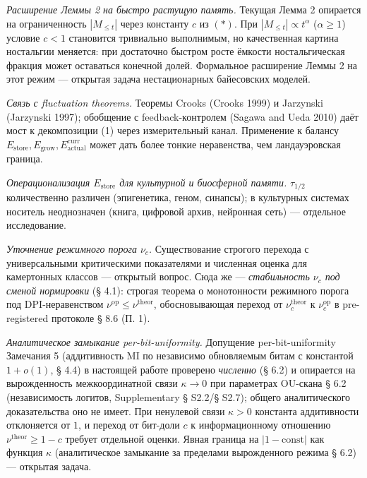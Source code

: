 \documentclass[pdflatex,sn-mathphys-ay]{sn-jnl}
\providecommand{\lt}{<}\providecommand{\gt}{>}
\begin{document}
\emph{Расширение Леммы 2 на быстро растущую память.} Текущая Лемма 2 опирается на ограниченность \(|M_{\le t}|\) через константу \(c\) из \((*)\). При \(|M_{\le t}| \propto t^\alpha\) (\(\alpha \ge 1\)) условие \(c \lt 1\) становится тривиально выполнимым, но качественная картина ностальгии меняется: при достаточно быстром росте ёмкости ностальгическая фракция может оставаться конечной долей. Формальное расширение Леммы 2 на этот режим --- открытая задача нестационарных байесовских моделей.



\emph{Связь с fluctuation theorems.} Теоремы Crooks (Crooks 1999) и Jarzynski (Jarzynski 1997); обобщение с feedback-контролем (Sagawa and Ueda 2010) даёт мост к декомпозиции (1) через измерительный канал. Применение к балансу \(E_{\text{store}}, E_{\text{grow}}, E_{\text{actual}}^{\text{curr}}\) может дать более тонкие неравенства, чем ландауэровская граница.



\emph{Операционализация \(E_{\text{store}}\) для культурной и биосферной памяти.} \(\tau_{1/2}\) количественно различен (эпигенетика, геном, синапсы); в культурных системах носитель неоднозначен (книга, цифровой архив, нейронная сеть) --- отдельное исследование.



\emph{Уточнение режимного порога \(\nu_c\).} Существование строгого перехода с универсальными критическими показателями и численная оценка для камертонных классов --- открытый вопрос. Сюда же --- \emph{стабильность \(\nu_c\) под сменой нормировки} (§ 4.1): строгая теорема о монотонности режимного порога под DPI-неравенством \(\nu^{\text{op}} \le \nu^{\text{theor}}\), обосновывающая переход от \(\nu_c^{\text{theor}}\) к \(\nu_c^{\text{op}}\) в pre-registered протоколе § 8.6 (П. 1).



\emph{Аналитическое замыкание per-bit-uniformity.} Допущение per-bit-uniformity Замечания 5 (аддитивность MI по независимо обновляемым битам с константой \(1+o(1)\), § 4.4) в настоящей работе проверено \emph{численно} (§ 6.2) и опирается на вырожденность межкоординатной связи \(\kappa \to 0\) при параметрах OU-скана § 6.2 (независимость логитов, Supplementary § S2.2/§ S2.7); общего аналитического доказательства оно не имеет. При ненулевой связи \(\kappa > 0\) константа аддитивности отклоняется от \(1\), и переход от бит-доли \(c\) к информационному отношению \(\nu^{\text{theor}} \ge 1 - c\) требует отдельной оценки. Явная граница на \(|1 - \text{const}|\) как функция \(\kappa\) (аналитическое замыкание за пределами вырожденного режима § 6.2) --- открытая задача.
\end{document}
